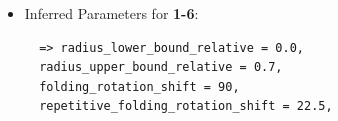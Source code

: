 \begin{itemize}
\item Inferred Parameters for \textbf{1-6}: 
 \begin{lstlisting}
  => radius_lower_bound_relative = 0.0, 
  radius_upper_bound_relative = 0.7,
  folding_rotation_shift = 90, 
  repetitive_folding_rotation_shift = 22.5,
\end{lstlisting}
\end{itemize}